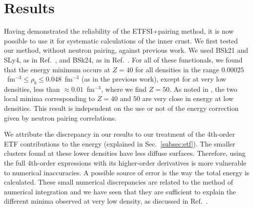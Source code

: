 \documentclass[
    amsmath,amssymb,
    aps,
    prc,
    floatfix,
]{revtex4-2}
\begin{document}
\section{Results}\label{sec:results}

Having demonstrated the reliability of the ETFSI+pairing method, it is now possible to use it for systematic calculations of the inner crust. We first tested our method, without neutron pairing, against previous work. We used BSk21 and SLy4, as in Ref.~\cite{pearsonInnerCrustNeutron2012}, and BSk24, as in Ref.~\cite{pearsonUnifiedEquationsState2018,pearsonErratumUnifiedEquations2019}. For all of these functionals, we found that the energy minimum occurs at $Z=40$ for all densities in the range $0.00025$~fm$^{-3}\leq\rho_b\leq0.048$~fm$^{-3}$ (as in the previous work), except for at very low densities, less than $\approx0.01$~fm$^{-3}$, where we find $Z=50$. As noted in \cite{pearsonInnerCrustNeutron2012}, the two local minima corresponding to $Z=40$ and $50$ are very close in energy at low densities. This result is independent on the use or not of the energy correction given by neutron pairing correlations.

We attribute the discrepancy in our results to our treatment of the 4th-order ETF contributions to the energy (explained in Sec.~\ref{subsec:etf}). The smaller clusters found at these lower densities have less diffuse surfaces. Therefore, using the full 4th-order expressions with its higher-order derivatives is more vulnerable to numerical inaccuracies. A possible source of error is the way the total energy is calculated. These small numerical discrepancies are related to the method of numerical integration and we have seen that they are sufficient to explain the different minima observed at very low density, as discussed in Ref.~\cite{pearsonInnerCrustNeutron2012}.
\end{document}
